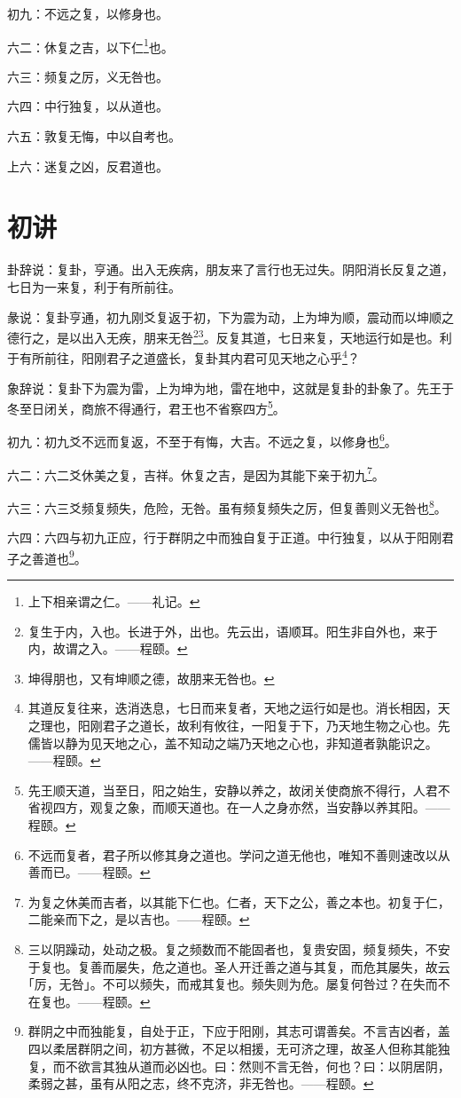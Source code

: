 \documentclass[12pt,oneside]{book}
\begin{document}
初九：不远之复，以修身也。

六二：休复之吉，以下仁\footnote{上下相亲谓之仁。——礼记。}也。

六三：频复之厉，义无咎也。

六四：中行独复，以从道也。

六五：敦复无悔，中以自考也。

上六：迷复之凶，反君道也。

\section{初讲}
卦辞说：复卦，亨通。出入无疾病，朋友来了言行也无过失。阴阳消长反复之道，七日为一来复，利于有所前往。

彖说：复卦亨通，初九刚爻复返于初，下为震为动，上为坤为顺，震动而以坤顺之德行之，是以出入无疾，朋来无咎\footnote{复生于内，入也。长进于外，出也。先云出，语顺耳。阳生非自外也，来于内，故谓之入。——程颐。}\footnote{坤得朋也，又有坤顺之德，故朋来无咎也。}。反复其道，七日来复，天地运行如是也。利于有所前往，阳刚君子之道盛长，复卦其内君可见天地之心乎\footnote{其道反复往来，迭消迭息，七日而来复者，天地之运行如是也。消长相因，天之理也，阳刚君子之道长，故利有攸往，一阳复于下，乃天地生物之心也。先儒皆以静为见天地之心，盖不知动之端乃天地之心也，非知道者孰能识之。——程颐。}？

象辞说：复卦下为震为雷，上为坤为地，雷在地中，这就是复卦的卦象了。先王于冬至日闭关，商旅不得通行，君王也不省察四方\footnote{先王顺天道，当至日，阳之始生，安静以养之，故闭关使商旅不得行，人君不省视四方，观复之象，而顺天道也。在一人之身亦然，当安静以养其阳。——程颐。}。

初九：初九爻不远而复返，不至于有悔，大吉。不远之复，以修身也\footnote{不远而复者，君子所以修其身之道也。学问之道无他也，唯知不善则速改以从善而已。——程颐。}。

六二：六二爻休美之复，吉祥。休复之吉，是因为其能下亲于初九\footnote{为复之休美而吉者，以其能下仁也。仁者，天下之公，善之本也。初复于仁，二能亲而下之，是以吉也。——程颐。}。

六三：六三爻频复频失，危险，无咎。虽有频复频失之厉，但复善则义无咎也\footnote{三以阴躁动，处动之极。复之频数而不能固者也，复贵安固，频复频失，不安于复也。复善而屡失，危之道也。圣人开迁善之道与其复，而危其屡失，故云｢厉，无咎｣。不可以频失，而戒其复也。频失则为危。屡复何咎过？在失而不在复也。——程颐。}。

六四：六四与初九正应，行于群阴之中而独自复于正道。中行独复，以从于阳刚君子之善道也\footnote{群阴之中而独能复，自处于正，下应于阳刚，其志可谓善矣。不言吉凶者，盖四以柔居群阴之间，初方甚微，不足以相援，无可济之理，故圣人但称其能独复，而不欲言其独从道而必凶也。曰：然则不言无咎，何也？曰：以阴居阴，柔弱之甚，虽有从阳之志，终不克济，非无咎也。——程颐。}。
\end{document}
